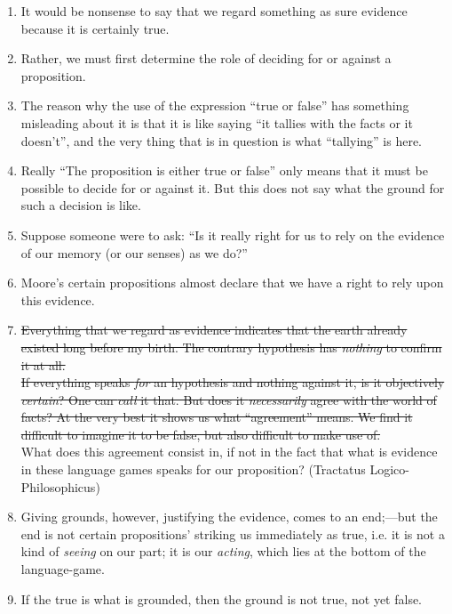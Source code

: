 \documentclass{book}
\begin{document}
\begin{enumerate}
\item
It would be nonsense to say that we regard something as sure evidence because
it is certainly true.

\item
Rather, we must first determine the role of deciding for or against a
proposition.

\item
The reason why the use of the expression ``true or false'' has something
misleading about it is that it is like saying ``it tallies with the facts or it
doesn't'', and the very thing that is in question is what ``tallying'' is here.

\item
Really ``The proposition is either true or false'' only means that it must be
possible to decide for or against it. But this does not say what the ground for
such a decision is like.

\item
Suppose someone were to ask: ``Is it really right for us to rely on the
evidence of our memory (or our senses) as we do?''

\item
Moore's certain propositions almost declare that we have a right to rely upon
this evidence.

\item
\st{Everything that we regard as evidence indicates that the earth already
	existed long before my birth. The contrary hypothesis has \emph{nothing} to
	confirm it at all. \\ If everything speaks \emph{for} an hypothesis and
	nothing against it, is it objectively \emph{certain}? One can \emph{call}
	it that. But does it \emph{necessarily} agree with the world of facts? At
	the very best it shows us what ``agreement'' means. We find it difficult to
	imagine it to be false, but also difficult to make use of.} \\
What does this agreement consist in, if not in the fact that what is evidence
in these language games speaks for our proposition?  (Tractatus
Logico-Philosophicus)

\item
Giving grounds, however, justifying the evidence, comes to an end;---but the
end is not certain propositions' striking us immediately as true, i.e. it is
not a kind of \emph{seeing} on our part; it is our \emph{acting}, which lies at
the bottom of the language-game.

\item
If the true is what is grounded, then the ground is not true, not yet false.


\end{enumerate}
\end{document}
